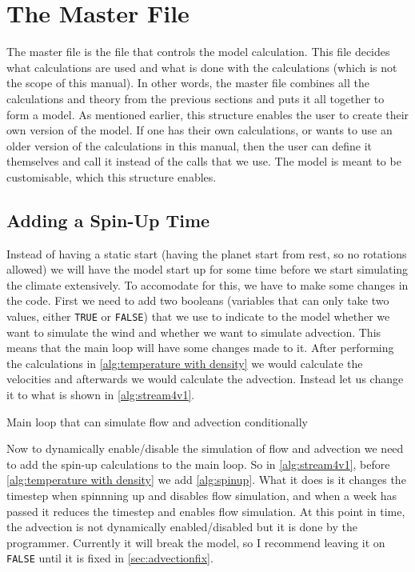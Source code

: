 \section{The Master File}
The master file is the file that controls the model calculation. This file decides what calculations are used and  what is done with the calculations (which is not the scope of this manual).
In other words, the master file combines all the calculations and theory from the previous sections and puts it all together to form a model. As mentioned earlier, this structure enables the 
user to create their own version of the model. If one has their own calculations, or wants to use an older version of the calculations in this manual, then the user can define it themselves
and call it instead of the calls that we use. The model is meant to be customisable, which this structure enables.

\subsection{Adding a Spin-Up Time}
Instead of having a static start (having the planet start from rest, so no rotations allowed) we will have the model start up for some time before we start simulating the climate extensively.
To accomodate for this, we have to make some changes in the code. First we need to add two booleans (variables that can only take two values, either \texttt{TRUE} or \texttt{FALSE}) that we use
to indicate to the model whether we want to simulate the wind and whether we want to simulate advection. This means that the main loop will have some changes made to it. After performing the 
calculations in \autoref{alg:temperature with density} we would calculate the velocities and afterwards we would calculate the advection. Instead let us change it to what is shown in 
\autoref{alg:stream4v1}.

\begin{algorithm}
    \caption{Main loop that can simulate flow and advection conditionally}
    \label{alg:stream4v1}
\end{algorithm}

Now to dynamically enable/disable the simulation of flow and advection we need to add the spin-up calculations to the main loop. So in \autoref{alg:stream4v1}, before 
\autoref{alg:temperature with density} we add \autoref{alg:spinup}. What it does is it changes the timestep when spinnning up and disables flow simulation, and when a week has passed it reduces 
the timestep and enables flow simulation. At this point in time, the advection is not dynamically enabled/disabled but it is done by the programmer. Currently it will break the model, so I 
recommend leaving it on \texttt{FALSE} until it is fixed in \autoref{sec:advectionfix}.

